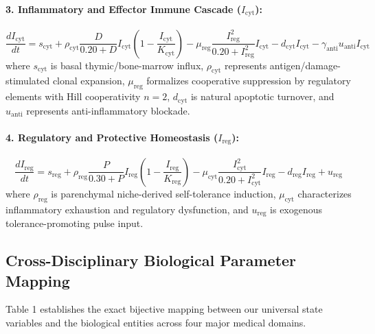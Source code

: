 \documentclass[11pt,a4paper]{article}
\begin{document}
\paragraph{3. Inflammatory and Effector Immune Cascade ($I_{\mathrm{cyt}}$):}
\begin{equation}
\frac{dI_{\mathrm{cyt}}}{dt} = s_{\mathrm{cyt}} + \rho_{\mathrm{cyt}} \frac{D}{0.20 + D} I_{\mathrm{cyt}} \left(1 - \frac{I_{\mathrm{cyt}}}{K_{\mathrm{cyt}}}\right) - \mu_{\mathrm{reg}} \frac{I_{\mathrm{reg}}^2}{0.20 + I_{\mathrm{reg}}^2} I_{\mathrm{cyt}} - d_{\mathrm{cyt}} I_{\mathrm{cyt}} - \gamma_{\mathrm{anti}} u_{\mathrm{anti}} I_{\mathrm{cyt}}
\end{equation}
where $s_{\mathrm{cyt}}$ is basal thymic/bone-marrow influx, $\rho_{\mathrm{cyt}}$ represents antigen/damage-stimulated clonal expansion, $\mu_{\mathrm{reg}}$ formalizes cooperative suppression by regulatory elements with Hill cooperativity $n=2$, $d_{\mathrm{cyt}}$ is natural apoptotic turnover, and $u_{\mathrm{anti}}$ represents anti-inflammatory blockade.

\paragraph{4. Regulatory and Protective Homeostasis ($I_{\mathrm{reg}}$):}
\begin{equation}
\frac{dI_{\mathrm{reg}}}{dt} = s_{\mathrm{reg}} + \rho_{\mathrm{reg}} \frac{P}{0.30 + P} I_{\mathrm{reg}} \left(1 - \frac{I_{\mathrm{reg}}}{K_{\mathrm{reg}}}\right) - \mu_{\mathrm{cyt}} \frac{I_{\mathrm{cyt}}^2}{0.20 + I_{\mathrm{cyt}}^2} I_{\mathrm{reg}} - d_{\mathrm{reg}} I_{\mathrm{reg}} + u_{\mathrm{reg}}
\end{equation}
where $\rho_{\mathrm{reg}}$ is parenchymal niche-derived self-tolerance induction, $\mu_{\mathrm{cyt}}$ characterizes inflammatory exhaustion and regulatory dysfunction, and $u_{\mathrm{reg}}$ is exogenous tolerance-promoting pulse input.

\subsection{Cross-Disciplinary Biological Parameter Mapping}

Table 1 establishes the exact bijective mapping between our universal state variables and the biological entities across four major medical domains.
\end{document}
